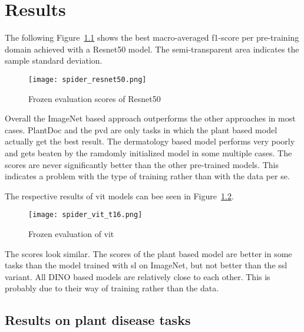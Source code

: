 \chapter{Results}\label{chapter_4}

The following Figure~\ref{fig:spider_resnet50} shows the best macro-averaged f1-score per pre-training domain achieved with a Resnet50 model. 
The semi-transparent area indicates the sample standard deviation.

\begin{figure}[H]
    \begin{center}
    \texttt{[image: spider\_resnet50.png]}
    \caption{Frozen evaluation scores of Resnet50}\label{fig:spider_resnet50}
    \end{center}
\end{figure}

Overall the ImageNet based approach outperforms the other approaches in most cases.
PlantDoc and the \gls{pvd} are only tasks in which the plant based model actually get the best result.
The dermatology based model performs very poorly and gets beaten by the ramdomly initialized model in some multiple cases.
The scores are never significantly better than the other pre-trained models. 
This indicates a problem with the type of training rather than with the data per se.

The respective results of \gls{vit} models can bee seen in Figure~\ref{fig:spider_vit_t16}.

\begin{figure}[H]
    \begin{center}
    \texttt{[image: spider\_vit\_t16.png]}
    \caption{Frozen evaluation of \gls{vit}}\label{fig:spider_vit_t16}
    \end{center}
\end{figure}

The scores look similar. 
The scores of the plant based model are better in some tasks than the model trained with \gls{sl} on ImageNet, but not better than the \gls{ssl} variant. 
All DINO based models are relatively close to each other. 
This is probably due to their way of training rather than the data.

\section{Results on plant disease tasks}

